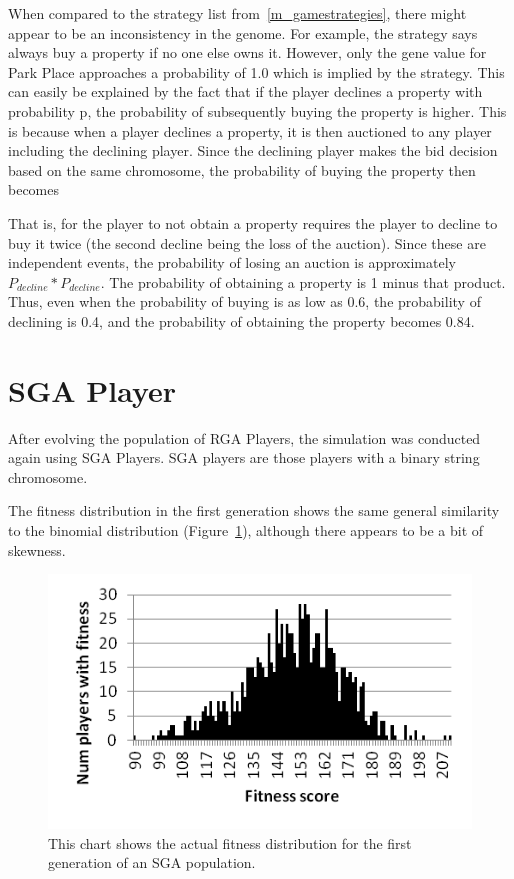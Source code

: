 When compared to the strategy list from~\ref{m_gamestrategies}, there might
appear to be an inconsistency in the genome. For example, the strategy says
always buy a property if no one else owns it. However, only the gene value for
Park Place approaches a probability of 1.0 which is implied by the strategy.
This can easily be explained by the fact that if the player declines a property
with probability p, the probability of subsequently buying the property is
higher. This is because when a player declines a property, it is then auctioned
to any player including the declining player. Since the declining player makes
the bid decision based on the same chromosome, the probability of buying the
property then becomes

That is, for the player to not obtain a property requires the player to decline
to buy it twice (the second decline being the loss of the auction). Since these
are independent events, the probability of losing an auction is approximately
\(P_{decline} * P_{decline}\). The probability of obtaining a property is 1
minus that product. Thus, even when the probability of buying is as low as 0.6,
the probability of declining is 0.4, and the probability of obtaining the
property becomes 0.84.

\section{SGA Player}

After evolving the population of RGA Players, the simulation was conducted again
using SGA Players. SGA players are those players with a binary string
chromosome.

The fitness distribution in the first generation shows the same general
similarity to the binomial distribution (Figure~\ref{figure-sga_gen0}), although
there appears to be a bit of skewness.

\begin{figure}[htp]
\centerline{\includegraphics[width=0.75\columnwidth]{Figures/sga_gen0.png}}
\caption[SGA Fitness Generation 0]{This chart shows the actual fitness
distribution for the first generation of an SGA population.}
\label{figure-sga_gen0}
\end{figure}

